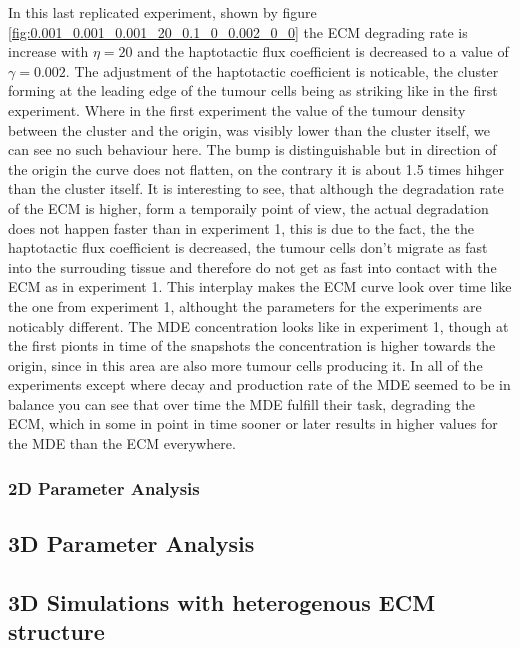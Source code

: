 In this last replicated experiment, shown by figure \ref{fig:0.001_0.001_0.001_20_0.1_0_0.002_0_0} the ECM degrading rate is increase with $\eta = 20$ and the haptotactic flux coefficient is decreased to a value of $\gamma = 0.002$. The adjustment of the haptotactic coefficient is noticable, the cluster forming at the leading edge of the tumour cells being as striking like in the first experiment. Where in the first experiment the value of the tumour density between the cluster and the origin, was visibly lower than the cluster itself, we can see no such behaviour here. The bump is distinguishable but in direction of the origin the curve does not flatten, on the contrary it is about 1.5 times hihger than the cluster itself. It is interesting to see, that although the degradation rate of the ECM is higher, form a temporaily point of view, the actual degradation does not happen faster than in experiment 1, this is due to the fact, the the haptotactic flux coefficient is decreased, the tumour cells don't migrate as fast into the surrouding tissue and therefore do not get as fast into contact with the ECM as in experiment 1. This interplay makes the ECM curve look over time like the one from experiment 1, althought the parameters for the experiments are noticably different. The MDE concentration looks like in experiment 1, though at the first pionts in time of the snapshots the concentration is higher towards the origin, since in this area are also more tumour cells producing it. \newline 
In all of the experiments except where decay and production rate of the MDE seemed to be in balance you can see that over time the MDE fulfill their task, degrading the ECM, which in some in point in time sooner or later results in higher values for the MDE than the ECM everywhere. 
\subsubsection{2D Parameter Analysis}
\subsection{3D Parameter Analysis}
\subsection{3D Simulations with heterogenous ECM structure}